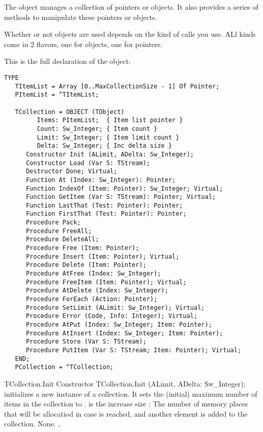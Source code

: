 The  object manages a collection of pointers or objects. 
It also provides a series of methods to manipulate these pointers or 
objects.

Whether or not objects are used depends on the kind of calls you use.
ALl kinds come in 2 flavors, one for objects, one for pointers.

This is the full declaration of the  object:

\begin{verbatim}
TYPE
   TItemList = Array [0..MaxCollectionSize - 1] Of Pointer;
   PItemList = ^TItemList;

   TCollection = OBJECT (TObject)
         Items: PItemList;  { Item list pointer }
         Count: Sw_Integer; { Item count }
         Limit: Sw_Integer; { Item limit count }
         Delta: Sw_Integer; { Inc delta size }
      Constructor Init (ALimit, ADelta: Sw_Integer);
      Constructor Load (Var S: TStream);
      Destructor Done; Virtual;
      Function At (Index: Sw_Integer): Pointer;
      Function IndexOf (Item: Pointer): Sw_Integer; Virtual;
      Function GetItem (Var S: TStream): Pointer; Virtual;
      Function LastThat (Test: Pointer): Pointer;
      Function FirstThat (Test: Pointer): Pointer;
      Procedure Pack;
      Procedure FreeAll;
      Procedure DeleteAll;
      Procedure Free (Item: Pointer);
      Procedure Insert (Item: Pointer); Virtual;
      Procedure Delete (Item: Pointer);
      Procedure AtFree (Index: Sw_Integer);
      Procedure FreeItem (Item: Pointer); Virtual;
      Procedure AtDelete (Index: Sw_Integer);
      Procedure ForEach (Action: Pointer);
      Procedure SetLimit (ALimit: Sw_Integer); Virtual;
      Procedure Error (Code, Info: Integer); Virtual;
      Procedure AtPut (Index: Sw_Integer; Item: Pointer);
      Procedure AtInsert (Index: Sw_Integer; Item: Pointer);
      Procedure Store (Var S: TStream);
      Procedure PutItem (Var S: TStream; Item: Pointer); Virtual;
   END;
   PCollection = ^TCollection;
\end{verbatim}

\begin{procedure}{TCollection.Init}
\Declaration
Constructor TCollection.Init (ALimit, ADelta: Sw\_Integer);
\Description
{} initializes a new instance of a collection. It sets the (initial) maximum number
of items in the collection to .  is the increase
size : The number of memory places that will be allocatiod in case  is reached, 
and another element is added to the collection.
\Errors
None. 
\SeeAlso
{}, 
\end{procedure}

